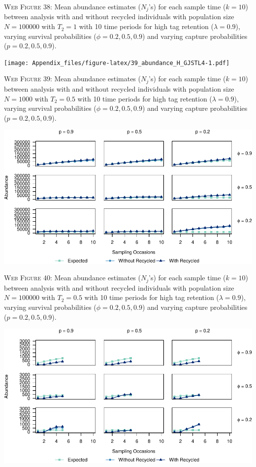 \documentclass[]{article}
\begin{document}
\textsc{Web Figure 38:} Mean abundance estimates (\(N_j\)'s) for each
sample time (\(k=10\)) between analysis with and without recycled
individuals with population size \(N=100000\) with \(T_2=1\) with 10
time periods for high tag retention (\(\lambda=0.9\)), varying survival
probabilities (\(\phi=0.2,0.5,0.9\)) and varying capture probabilities
(\(p=0.2,0.5,0.9\)).

\newpage

\texttt{[image: Appendix\_files/figure-latex/39\_abundance\_H\_GJSTL4-1.pdf]}

\textsc{Web Figure 39:} Mean abundance estimates (\(N_j\)'s) for each
sample time (\(k=10\)) between analysis with and without recycled
individuals with population size \(N=1000\) with \(T_2=0.5\) with 10
time periods for high tag retention (\(\lambda=0.9\)), varying survival
probabilities (\(\phi=0.2,0.5,0.9\)) and varying capture probabilities
(\(p=0.2,0.5,0.9\)).

\includegraphics{Appendix_files/figure-latex/40_abundance_H_GJSTL3-1.pdf}

\textsc{Web Figure 40:} Mean abundance estimates (\(N_j\)'s) for each
sample time (\(k=10\)) between analysis with and without recycled
individuals with population size \(N=100000\) with \(T_2=0.5\) with 10
time periods for high tag retention (\(\lambda=0.9\)), varying survival
probabilities (\(\phi=0.2,0.5,0.9\)) and varying capture probabilities
(\(p=0.2,0.5,0.9\)).

\newpage

\includegraphics{Appendix_files/figure-latex/41_abundance_H_GJSTL5-1.pdf}
\end{document}

